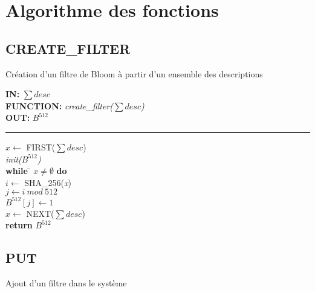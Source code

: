 \chapter{Algorithme des fonctions}
\section{CREATE\_FILTER}
\begin{algorithme}
	Création d'un filtre de Bloom à partir d'un ensemble des descriptions
\end{algorithme}

\begin{flushleft}
	\begin{framed}
		\textbf{IN:} $\sum desc$\\
		\textbf{FUNCTION:} \textit{create\_filter($\sum desc$)}\\
		\textbf{OUT:} \textit{$B^{512}$}\\

		\noindent\rule{\linewidth}{0.5pt}

		\begin{tabbing}
			$x \leftarrow$ FIRST($\sum desc$)\\
			\textit{init($B^{512}$)}\\
			\textbf{while} \= $x \neq \emptyset$ \textbf{do}\\
					\> $i \leftarrow$ SHA\_256(\textit{x})\\
					\> $j \leftarrow i\ mod\ 512$\\
					\> $B^{512}[j]\leftarrow 1$\\
					\> $x \leftarrow$ NEXT($\sum desc$)\\
			\textbf{return} $B^{512}$\\
	    	\end{tabbing}		
	\end{framed}
\end{flushleft}

\newpage
\section{PUT}
\begin{algorithme}
	Ajout d'un filtre dans le système
\end{algorithme}

